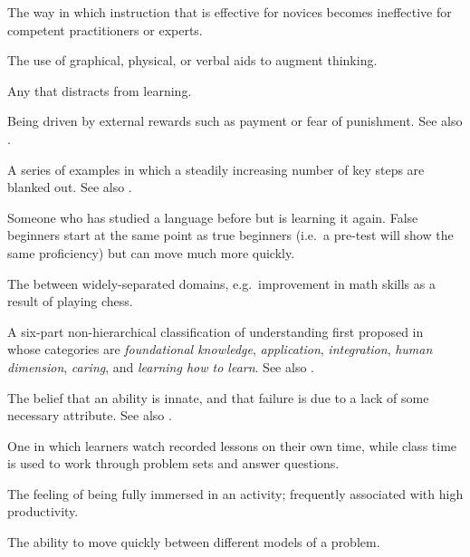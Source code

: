 \begin{description}
 The way in which
instruction that is effective for novices becomes ineffective for competent
practitioners or experts.

 The use of graphical,
physical, or verbal aids to augment thinking.

 Any 
that distracts from learning.

 Being driven by external
rewards such as payment or fear of punishment. See
also .

 A series of examples in which a steadily
increasing number of key steps are blanked out. See
also .

 Someone who has studied a language
before but is learning it again. False beginners start at the same point as true
beginners (i.e.\ a pre-test will show the same proficiency) but can move much
more quickly.

 The 
between widely-separated domains, e.g.\ improvement in math skills as a result
of playing chess.

 A six-part non-hierarchical
classification of understanding first proposed in~\cite{Fink2013} whose
categories are \emph{foundational knowledge}, \emph{application},
\emph{integration}, \emph{human dimension}, \emph{caring}, and \emph{learning
  how to learn}. See also .

 The belief that an ability is innate,
and that failure is due to a lack of some necessary attribute. See also
.

 One in which learners watch
recorded lessons on their own time, while class time is used to work through
problem sets and answer questions.

 The feeling of being fully immersed in an activity;
frequently associated with high productivity.

 The ability to move
quickly between different models of a problem.


\end{description}
